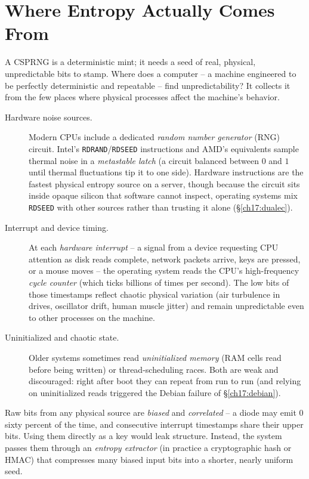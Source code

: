 \section{Where Entropy Actually Comes From}
\label{ch17:entropy-sources}

A CSPRNG is a deterministic mint; it needs a seed of real, physical, unpredictable bits to stamp. Where does a computer -- a machine engineered to be perfectly deterministic and repeatable -- find unpredictability? It collects it from the few places where physical processes affect the machine's behavior.

\begin{description}
  \item[Hardware noise sources.] Modern CPUs include a dedicated \emph{random number generator} (RNG) circuit. Intel's \texttt{RDRAND}/\texttt{RDSEED} instructions and AMD's equivalents sample thermal noise in a \emph{metastable latch} (a circuit balanced between $0$ and $1$ until thermal fluctuations tip it to one side). Hardware instructions are the fastest physical entropy source on a server, though because the circuit sits inside opaque silicon that software cannot inspect, operating systems mix \texttt{RDSEED} with other sources rather than trusting it alone (\S\ref{ch17:dualec}).
  \item[Interrupt and device timing.] At each \emph{hardware interrupt} -- a signal from a device requesting CPU attention as disk reads complete, network packets arrive, keys are pressed, or a mouse moves -- the operating system reads the CPU's high-frequency \emph{cycle counter} (which ticks billions of times per second). The low bits of those timestamps reflect chaotic physical variation (air turbulence in drives, oscillator drift, human muscle jitter) and remain unpredictable even to other processes on the machine.
  \item[Uninitialized and chaotic state.] Older systems sometimes read \emph{uninitialized memory} (RAM cells read before being written) or thread-scheduling races. Both are weak and discouraged: right after boot they can repeat from run to run (and relying on uninitialized reads triggered the Debian failure of \S\ref{ch17:debian}).
\end{description}

Raw bits from any physical source are \emph{biased} and \emph{correlated} -- a diode may emit $0$ sixty percent of the time, and consecutive interrupt timestamps share their upper bits. Using them directly as a key would leak structure. Instead, the system passes them through an \emph{entropy extractor} (in practice a cryptographic hash or HMAC) that compresses many biased input bits into a shorter, nearly uniform seed.

